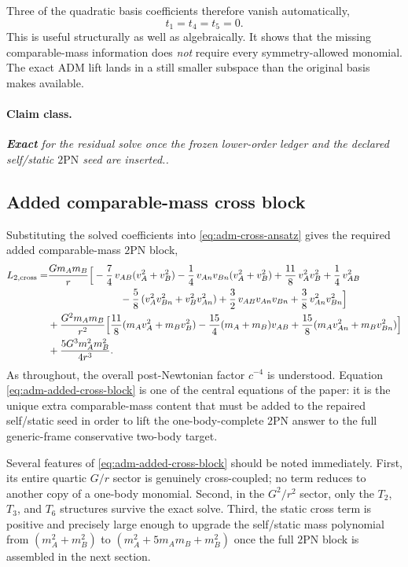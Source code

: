 \documentclass[11pt]{article}
\newcommand{\TwoPN}{\mathrm{2PN}}
\newcommand{\ADM}{\mathrm{ADM}}
\newcommand{\Exact}{\textbf{Exact}}
\newcommand{\claimclass}[1]{\paragraph{Claim class.}\emph{#1.}}
\begin{document}
Three of the quadratic basis coefficients therefore vanish automatically,
\begin{equation}
t_1=t_4=t_5=0.
\label{eq:adm-vanishing-t}
\end{equation}
This is useful structurally as well as algebraically.  It shows that the missing
comparable-mass information does \emph{not} require every symmetry-allowed monomial.
The exact \(\ADM\) lift lands in a still smaller subspace than the original basis makes
available.

\claimclass{\Exact{} for the residual solve once the frozen lower-order ledger and the
declared self/static \(\TwoPN\) seed are inserted.}

\subsection{Added comparable-mass cross block}
\label{sec:adm-added-cross}

Substituting the solved coefficients into \cref{eq:adm-cross-ansatz} gives the required
added comparable-mass \(\TwoPN\) block,
\begin{align}
L_{2,\mathrm{cross}}=
&\frac{Gm_A m_B}{r}
\Big[
-\frac74\,v_{AB}(v_A^2+v_B^2)
-\frac14\,v_{An}v_{Bn}(v_A^2+v_B^2)
+\frac{11}{8}\,v_A^2v_B^2
+\frac14\,v_{AB}^2 \notag\\
&\hspace{7.25em}
-\frac58\,(v_A^2v_{Bn}^2+v_B^2v_{An}^2)
+\frac32\,v_{AB}v_{An}v_{Bn}
+\frac38\,v_{An}^2v_{Bn}^2
\Big] \notag\\
&+\frac{G^2m_A m_B}{r^2}
\Big[
\frac{11}{8}(m_A v_A^2+m_B v_B^2)
-\frac{15}{4}(m_A+m_B)v_{AB}
+\frac{15}{8}(m_A v_{An}^2+m_B v_{Bn}^2)
\Big]
\notag\\
&+\frac{5G^3m_A^2m_B^2}{4r^3}.
\label{eq:adm-added-cross-block}
\end{align}
As throughout, the overall post-Newtonian factor \(c^{-4}\) is understood.  Equation
\cref{eq:adm-added-cross-block} is one of the central equations of the paper: it is the
unique extra comparable-mass content that must be added to the repaired self/static seed
in order to lift the one-body-complete \(\TwoPN\) answer to the full generic-frame
conservative two-body target.

Several features of \cref{eq:adm-added-cross-block} should be noted immediately.
First, its entire quartic \(G/r\) sector is genuinely cross-coupled; no term reduces to
another copy of a one-body monomial.  Second, in the \(G^2/r^2\) sector, only the
\(T_2\), \(T_3\), and \(T_6\) structures survive the exact solve.  Third, the static
cross term is positive and precisely large enough to upgrade the self/static mass
polynomial from
\((m_A^2+m_B^2)\) to
\((m_A^2+5m_A m_B+m_B^2)\)
once the full \(\TwoPN\) block is assembled in the next section.
\end{document}
